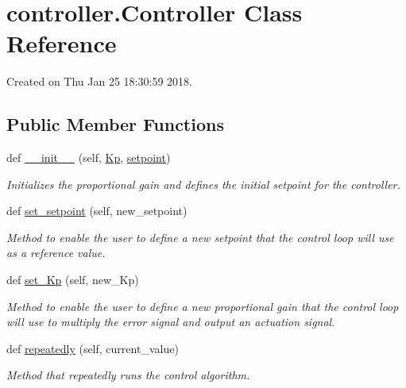 \hypertarget{classcontroller_1_1Controller}{}\section{controller.\+Controller Class Reference}
\label{classcontroller_1_1Controller}


Created on Thu Jan 25 18\+:30\+:59 2018.  


\subsection*{Public Member Functions}
\begin{DoxyCompactItemize}
\item 
def \hyperlink{classcontroller_1_1Controller_ae1f906f61cf6e1d30278aa39f6604657}{\+\_\+\+\_\+init\+\_\+\+\_\+} (self, \hyperlink{classcontroller_1_1Controller_a34cf377d78ee193d7160d74adbe9aabf}{Kp}, \hyperlink{classcontroller_1_1Controller_ace8a70b35ea15f3f7b6548c64aee1e48}{setpoint})
\begin{DoxyCompactList}\small\item\em Initializes the proportional gain and defines the initial setpoint for the controller. \end{DoxyCompactList}\item 
def \hyperlink{classcontroller_1_1Controller_acee6fffdca024ce396a2260b72e99059}{set\+\_\+setpoint} (self, new\+\_\+setpoint)
\begin{DoxyCompactList}\small\item\em Method to enable the user to define a new setpoint that the control loop will use as a reference value. \end{DoxyCompactList}\item 
def \hyperlink{classcontroller_1_1Controller_a048d7ed4722c40579b6bfbea25ae98c0}{set\+\_\+\+Kp} (self, new\+\_\+\+Kp)
\begin{DoxyCompactList}\small\item\em Method to enable the user to define a new proportional gain that the control loop will use to multiply the error signal and output an actuation signal. \end{DoxyCompactList}\item 
def \hyperlink{classcontroller_1_1Controller_abe90cd53f3b1712fb253c0feaad18a0d}{repeatedly} (self, current\+\_\+value)
\begin{DoxyCompactList}\small\item\em Method that repeatedly runs the control algorithm. \end{DoxyCompactList}\end{DoxyCompactItemize}
